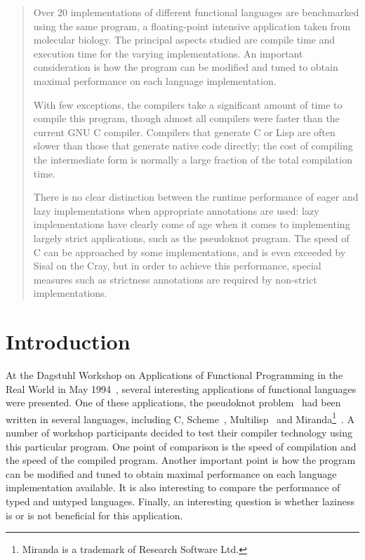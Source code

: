 \maketitle
\sloppy

\begin{abstract}
Over 20 implementations of different functional languages are
benchmarked using the same program, a floating-point intensive
application taken from molecular biology.  The principal aspects
studied are compile time and execution time for the varying
implementations.  An important consideration is how the program can be
modified and tuned to obtain maximal performance on each language
implementation.

With few exceptions, the compilers take a significant amount of time
to compile this program, though almost all compilers were faster than
the current GNU C compiler.  Compilers that generate C or Lisp are
often slower than those that generate native code directly; the cost
of compiling the intermediate form is normally a large fraction of the
total compilation time.

There is no clear distinction between the runtime performance of eager
and lazy implementations when appropriate annotations are used: lazy
implementations have clearly come of age when it comes to implementing
largely strict applications, such as the pseudoknot program. The speed
of C can be approached by some implementations, and is even exceeded
by Sisal on the Cray, but in order to achieve this performance,
special measures such as strictness annotations are required by
non-strict implementations.
\end{abstract}


\section{Introduction}
At the Dagstuhl Workshop on Applications of Functional Programming in
the Real World in May 1994~\cite{Gie94}, several interesting applications of
functional languages were presented. One of these applications, the
pseudoknot problem~\cite{Fee94} had been written in several languages,
including C, Scheme~\cite{Ree91}, Multilisp~\cite{Hal85} and
Miranda\footnote{Miranda is a trademark of Research Software Ltd.}~\cite{Tur85}.
A number
of workshop participants decided to test their compiler technology
using this particular program. One point of comparison is the speed of
compilation and the speed of the compiled program. Another important
point is how the program can be modified and tuned to obtain maximal
performance on each language implementation available. It is also
interesting to compare the performance of typed and untyped languages.
Finally, an interesting question is whether laziness is or is not
beneficial for this application.

